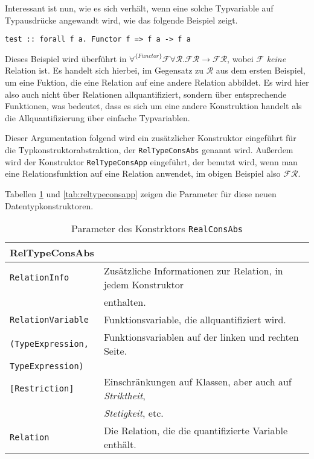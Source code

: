 Interessant ist nun, wie es sich verhält, wenn eine solche Typvariable auf Typausdrücke angewandt wird, wie das folgende
Beispiel zeigt.

\begin{verbatim}
test :: forall f a. Functor f => f a -> f a
\end{verbatim}

Dieses Beispiel wird überführt in $\forall^{\{Functor\}} \mathcal{F} \forall \mathcal{R}. \mathcal{F} \mathcal{R} \rightarrow
\mathcal{F} \mathcal{R}$, wobei $\mathcal{F}$ \textit{keine} Relation ist. Es handelt sich hierbei, im Gegensatz zu $\mathcal{R}$ aus
dem ersten Beispiel, um eine Fuktion, die eine Relation auf eine andere Relation abbildet. Es wird hier also auch nicht über
Relationen allquantifiziert, sondern über entsprechende Funktionen, was bedeutet, dass es sich um eine andere Konstruktion
handelt als die Allquantifizierung über einfache Typvariablen.

Dieser Argumentation folgend wird ein zusätzlicher Konstruktor eingeführt für die Typkonstruktorabstraktion, der
\texttt{RelTypeConsAbs} genannt wird. Außerdem wird der Konstruktor \texttt{RelTypeConsApp} eingeführt, der benutzt
wird, wenn man eine Relationsfunktion auf eine Relation anwendet, im obigen Beispiel also $\mathcal{F} \mathcal{R}$.

Tabellen \ref{tab:reltypeconsabs} und \ref{tab:reltypeconsapp} zeigen die Parameter für diese neuen Datentypkonstruktoren.

\begin{table}[th]
\begin{tabular}{ | l | l | }
\hline
RelTypeConsAbs & \\
\hline
\texttt{RelationInfo} & Zusätzliche Informationen zur Relation, in jedem Konstruktor \\
& enthalten. \\
\texttt{RelationVariable} & Funktionsvariable, die allquantifiziert wird. \\
\texttt{(TypeExpression,} & Funktionsvariablen auf der linken und rechten Seite. \\
\texttt{TypeExpression)} & \\
\texttt{[Restriction]} & Einschränkungen auf Klassen, aber auch auf \textit{Striktheit},\\
& \textit{Stetigkeit}, etc. \\
\texttt{Relation} & Die Relation, die die quantifizierte Variable enthält. \\
\hline
\end{tabular}
\caption{Parameter des Konstrktors \texttt{RealConsAbs}}
\label{tab:reltypeconsabs}
\end{table}

